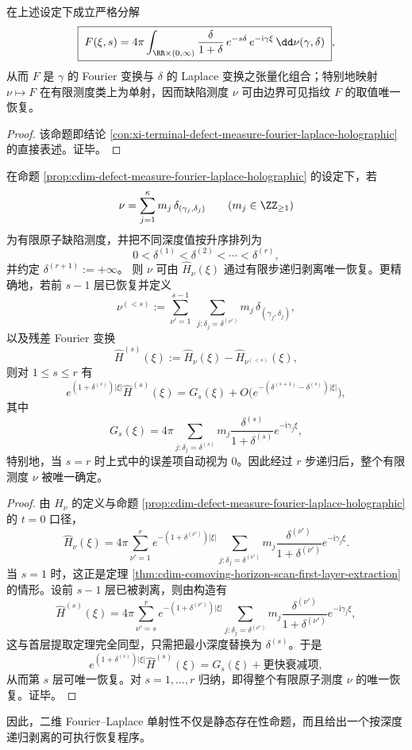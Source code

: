 \begin{proposition}[二维指纹的张量化分解与单射性]\label{prop:cdim-defect-measure-fourier-laplace-holographic}
在上述设定下成立严格分解
\[
\boxed{\;
F(\xi,s)=4\pi\int_{\RR\times(0,\infty)}\frac{\delta}{1+\delta}\,e^{-s\delta}\,e^{-\mathrm{i}\gamma\xi}\,\dd\nu(\gamma,\delta)\; } ,
\]
从而 \(F\) 是 \(\gamma\) 的 Fourier 变换与 \(\delta\) 的 Laplace 变换之张量化组合；特别地映射 \(\nu\mapsto F\) 在有限测度类上为单射，因而缺陷测度 \(\nu\) 可由边界可见指纹 \(F\) 的取值唯一恢复。
\end{proposition}
\begin{proof}
该命题即结论 \ref{con:xi-terminal-defect-measure-fourier-laplace-holographic} 的直接表述。证毕。
\end{proof}

\begin{theorem}[有限缺陷测度的递归层剥离唯一性]\label{thm:cdim-defect-measure-recursive-layer-peeling}
在命题 \ref{prop:cdim-defect-measure-fourier-laplace-holographic} 的设定下，若
\[
\nu=\sum_{j=1}^{\kappa} m_j\,\delta_{(\gamma_j,\delta_j)}
\qquad
(m_j\in\ZZ_{\ge 1})
\]
为有限原子缺陷测度，并把不同深度值按升序排列为
\[
0<\delta^{(1)}<\delta^{(2)}<\cdots<\delta^{(r)},
\]
并约定 \(\delta^{(r+1)}:=+\infty\)。
则 \(\nu\) 可由 \(\widehat H_\nu(\xi)\) 通过有限步递归剥离唯一恢复。更精确地，若前 \(s-1\) 层已恢复并定义
\[
\nu^{(<s)}:=
\sum_{\nu'=1}^{s-1}\ \sum_{j:\delta_j=\delta^{(\nu')}}m_j\,\delta_{(\gamma_j,\delta_j)},
\]
以及残差 Fourier 变换
\[
\widehat H^{(s)}(\xi):=\widehat H_\nu(\xi)-\widehat H_{\nu^{(<s)}}(\xi),
\]
则对 \(1\le s\le r\) 有
\[
e^{(1+\delta^{(s)})|\xi|}\widehat H^{(s)}(\xi)
=
G_s(\xi)+
O\!\bigl(e^{-(\delta^{(s+1)}-\delta^{(s)})|\xi|}\bigr),
\]
其中
\[
G_s(\xi)=
4\pi\sum_{j:\delta_j=\delta^{(s)}}
m_j\frac{\delta^{(s)}}{1+\delta^{(s)}}e^{-\mathrm{i}\gamma_j\xi},
\]
特别地，当 \(s=r\) 时上式中的误差项自动视为 \(0\)。因此经过 \(r\) 步递归后，整个有限测度 \(\nu\) 被唯一确定。
\end{theorem}
\begin{proof}
由 \(H_\nu\) 的定义与命题 \ref{prop:cdim-defect-measure-fourier-laplace-holographic} 的 \(t=0\) 口径，
\[
\widehat H_\nu(\xi)
=
4\pi\sum_{\nu'=1}^{r}
e^{-(1+\delta^{(\nu')})|\xi|}
\sum_{j:\delta_j=\delta^{(\nu')}}
m_j\frac{\delta^{(\nu')}}{1+\delta^{(\nu')}}e^{-\mathrm{i}\gamma_j\xi}.
\]
当 \(s=1\) 时，这正是定理 \ref{thm:cdim-comoving-horizon-scan-first-layer-extraction} 的情形。设前 \(s-1\) 层已被剥离，则由构造有
\[
\widehat H^{(s)}(\xi)
=
4\pi\sum_{\nu'=s}^{r}
e^{-(1+\delta^{(\nu')})|\xi|}
\sum_{j:\delta_j=\delta^{(\nu')}}
m_j\frac{\delta^{(\nu')}}{1+\delta^{(\nu')}}e^{-\mathrm{i}\gamma_j\xi},
\]
这与首层提取定理完全同型，只需把最小深度替换为 \(\delta^{(s)}\)。于是
\[
e^{(1+\delta^{(s)})|\xi|}\widehat H^{(s)}(\xi)
=
G_s(\xi)+\text{更快衰减项},
\]
从而第 \(s\) 层可唯一恢复。对 \(s=1,\dots,r\) 归纳，即得整个有限原子测度 \(\nu\) 的唯一恢复。证毕。
\end{proof}
因此，二维 Fourier--Laplace 单射性不仅是静态存在性命题，而且给出一个按深度递归剥离的可执行恢复程序。

